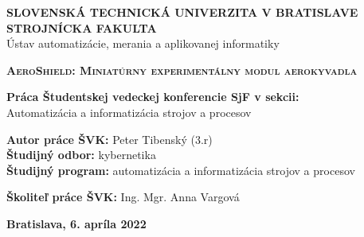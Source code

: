 \renewcommand\thepage{\roman{page}}
\thispagestyle{empty}

\noindent \begin{center}
	\textbf{{\large{}SLOVENSKÁ TECHNICKÁ UNIVERZITA V BRATISLAVE}}\\
	\textbf{{\large{}STROJNÍCKA FAKULTA}}\textbf{\large{} }\\
	{{\large{}Ústav automatizácie, merania a aplikovanej informatiky}}{\large{} }\\
	\vspace{3cm}
	\par\end{center}

\noindent \begin{center}
	\vspace{3cm}
	\par\end{center}



\begin{center}
	\textbf{\textsc{\Large{}AeroShield: Miniatúrny experimentálny modul aerokyvadla}}\\
	\par\end{center}{\Large \par}

\begin{center}
	\textbf{\large{}Práca Študentskej vedeckej konferencie SjF v sekcii:}\\
	{\large{}Automatizácia a informatizácia strojov a procesov}\\
	\par\end{center}{\large \par}

\vspace{4cm}

\begin{center}
	{\large{}\textbf{Autor práce ŠVK:} Peter Tibenský (3.r)}\\
	{\large{}\textbf{Študijný odbor:} kybernetika}\\
	{\large{}\textbf{Študijný program:} automatizácia a informatizácia strojov a procesov}\\
	\par\end{center}{\par}

\vspace{1cm}

\begin{center}
	{\large{}\textbf{Školiteľ práce ŠVK:} Ing. Mgr. Anna Vargová}\\
	\par\end{center}{\par}

\vspace{1cm}

\begin{center}
	{\large{}\textbf{Bratislava, 6. apríla 2022}}\\
	\par\end{center}{\par}


\cleardoublepage
